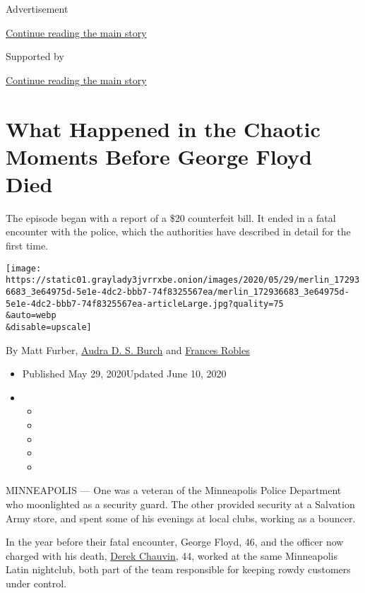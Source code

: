 Advertisement

\protect\hyperlink{after-top}{Continue reading the main story}

Supported by

\protect\hyperlink{after-sponsor}{Continue reading the main story}

\hypertarget{what-happened-in-the-chaotic-moments-before-george-floyd-died}{%
\section{What Happened in the Chaotic Moments Before George Floyd
Died}\label{what-happened-in-the-chaotic-moments-before-george-floyd-died}}

The episode began with a report of a \$20 counterfeit bill. It ended in
a fatal encounter with the police, which the authorities have described
in detail for the first time.

\texttt{[image: https://static01.graylady3jvrrxbe.onion/images/2020/05/29/merlin\_172936683\_3e64975d-5e1e-4dc2-bbb7-74f8325567ea/merlin\_172936683\_3e64975d-5e1e-4dc2-bbb7-74f8325567ea-articleLarge.jpg?quality=75\\\&auto=webp\\\&disable=upscale]}

By Matt Furber,
\href{https://www.nytimes3xbfgragh.onion/by/audra-d-s-burch}{Audra D. S.
Burch} and
\href{https://www.nytimes3xbfgragh.onion/by/frances-robles}{Frances
Robles}

\begin{itemize}
\item
  Published May 29, 2020Updated June 10, 2020
\item
  \begin{itemize}
  \item
  \item
  \item
  \item
  \item
  \end{itemize}
\end{itemize}

MINNEAPOLIS --- One was a veteran of the Minneapolis Police Department
who moonlighted as a security guard. The other provided security at a
Salvation Army store, and spent some of his evenings at local clubs,
working as a bouncer.

In the year before their fatal encounter, George Floyd, 46, and the
officer now charged with his death,
\href{https://www.nytimes3xbfgragh.onion/2020/07/18/us/derek-chauvin-george-floyd.html}{Derek
Chauvin}, 44, worked at the same Minneapolis Latin nightclub, both part
of the team responsible for keeping rowdy customers under control.

